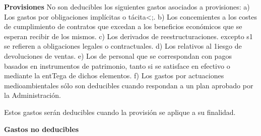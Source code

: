 \documentclass[10pt,a4paper]{article}
\begin{document}
\textbf{Provisiones}
No son deducibles los siguientes gastos asociados a provisiones:
a) Los gastos por obligaciones implícitas o tácita<;. 
b) Los concemientes a los costes de cumplimiento de contratos que excedan a los beneficios económicos que se esperan recibir de los mismos.
c) Los derivados de reestructuraciones. excepto s1 se refieren a obligaciones legales o contractuales.
d) Los relativos al 1iesgo de devoluciones de ventas.
e) Los de personal que se correspondan con pagos basados en instrumentos de patrimonio, tanto si se satisface en efectivo o mediante la entTega de dichos elementos.
f) Los gastos por actuaciones medioambientales sólo son deducibles cuando respondan a un plan aprobado por la Administración.

Estos gastos serán deducibles cuando la provisión se aplique a su finalidad.

\textbf{Gastos no deducibles}
\end{document}
